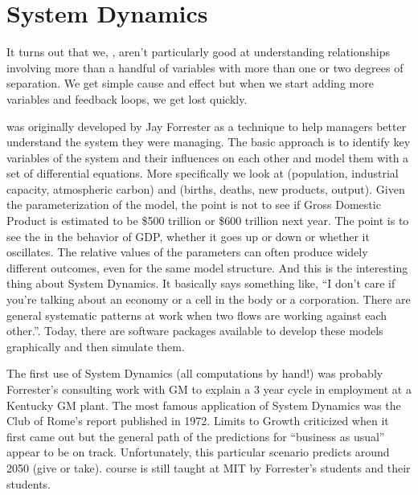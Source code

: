 \documentclass[letterpaper,10pt,english]{sphinxmanual}
\begin{document}
\section{System Dynamics}
\label{\detokenize{index:System-Dynamics}}
It turns out that we, , aren’t particularly good at understanding relationships involving more than a handful of variables with more than one or two degrees of separation. We get simple cause and effect but when we start adding more variables and feedback loops, we get lost quickly.

 was originally developed by Jay Forrester as a technique to help managers better understand the system they were managing. The basic approach is to identify key variables of the system and their influences on each other and model them with a set of differential equations. More specifically we look at  (population, industrial capacity, atmospheric carbon) and  (births, deaths, new products, output). Given the
parameterization of the model, the point is not to see if Gross Domestic Product is estimated to be \$500 trillion or \$600 trillion next year. The point is to see the  in the behavior of GDP, whether it goes up or down or whether it oscillates. The relative values of the parameters can often produce widely different outcomes, even for the same model structure. And this is the interesting thing about System Dynamics. It basically says something like, “I don’t care if you’re talking about
an economy or a cell in the body or a corporation. There are general systematic patterns at work when two flows are working against each other.”. Today, there are software packages available to develop these models graphically and then simulate them.

The first use of System Dynamics (all computations by hand!) was probably Forrester’s consulting work with GM to explain a 3 year cycle in employment at a Kentucky GM plant. The most famous application of System Dynamics was the Club of Rome’s  report published in 1972. Limits to Growth criticized when it first came out but the general path of the predictions for “business as usual” appear to be on track. Unfortunately,
this particular scenario predicts  around 2050 (give or take).  course is still taught at MIT by Forrester’s students and their students.
\end{document}
